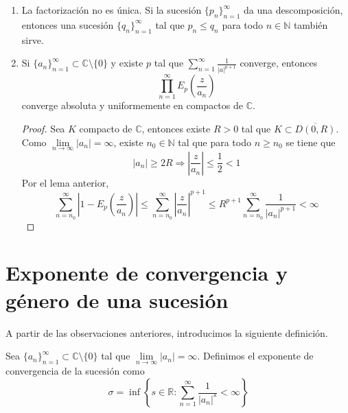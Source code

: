 \begin{remark}
    \hfill
    \begin{enumerate}
        \item La factorización no es única.
              Si la sucesión $\{p_n\}_{n=1}^\infty$ da una descomposición, entonces una sucesión $\{q_n\}_{n=1}^\infty$ tal que $p_n \leq q_n$ para todo $n \in \mathbb{N}$ también sirve.

        \item Si $\{a_n\}_{n=1}^\infty \subset \mathbb{C} \setminus \{0\}$ y existe $p$ tal que $\sum_{n=1}^\infty \frac{1}{|a|^{p+1}}$ converge, entonces
              $$\prod_{n=1}^\infty E_p\left(\frac{z}{a_n}\right)$$
              converge absoluta y uniformemente en compactos de $\mathbb{C}$.
              \begin{proof}
                  Sea $K$ compacto de $\mathbb{C}$, entonces existe $R > 0$ tal que $K \subset \overline{D(0, R)}$.
                  Como $\lim\limits_{n \to \infty} |a_n| = \infty$, existe $n_0 \in \mathbb{N}$ tal que para todo $n \geq n_0$ se tiene que
                  $$|a_n| \geq 2R \Rightarrow \left|\frac{z}{a_n}\right| \leq \frac{1}{2} < 1$$
                  Por el lema anterior,
                  $$\sum_{n=n_0}^\infty \left|1-E_p\left(\frac{z}{a_n}\right)\right| \leq \sum_{n=n_0}^\infty \left|\frac{z}{a_n}\right|^{p+1} \leq R^{p+1}\sum_{n=n_0}^\infty \frac{1}{|a_n|^{p+1}} < \infty$$
              \end{proof}
    \end{enumerate}
\end{remark}

\section{Exponente de convergencia y género de una sucesión}
A partir de las observaciones anteriores, introducimos la siguiente definición.

\begin{definition}
    Sea $\{a_n\}_{n=1}^\infty \subset \mathbb{C} \setminus \{0\}$ tal que $\lim\limits_{n \to \infty} |a_n| = \infty$.
    Definimos el exponente de convergencia de la sucesión como
    $$\sigma = \inf\left\{s \in \mathbb{R} : \sum_{n=1}^\infty \frac{1}{|a_n|^s} < \infty\right\}$$
\end{definition}

